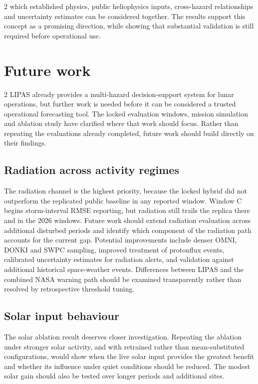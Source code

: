\begin{multicols}{2}
which established physics, public heliophysics inputs, cross-hazard relationships and uncertainty estimates can be considered together. The results support this concept as a promising direction, while showing that substantial validation is still required before operational use.
\end{multicols}
\section{Future work}
\begin{multicols}{2}
LIPAS already provides a multi-hazard decision-support system for lunar operations, but further work is needed before it can be considered a trusted operational forecasting tool. The locked evaluation windows, mission simulation and ablation study have clarified where that work should focus. Rather than repeating the evaluations already completed, future work should build directly on their findings.

\subsection{Radiation across activity regimes}

The radiation channel is the highest priority, because the locked hybrid did not outperform the replicated public baseline in any reported window. Window C begins storm-interval RMSE reporting, but radiation still trails the replica there and in the 2026 windows. Future work should extend radiation evaluation across additional disturbed periods and identify which component of the radiation path accounts for the current gap. Potential improvements include denser OMNI, DONKI and SWPC sampling, improved treatment of protonflux events, calibrated uncertainty estimates for radiation alerts, and validation against additional historical space-weather events. Differences between LIPAS and the combined NASA warning path should be examined transparently rather than resolved by retrospective threshold tuning.

\subsection{Solar input behaviour}

The solar ablation result deserves closer investigation. Repeating the ablation under stronger solar activity, and with retrained rather than mean-substituted configurations, would show when the live solar input provides the greatest benefit and whether its influence under quiet conditions should be reduced. The modest solar gain should also be tested over longer periods and additional sites.


\end{multicols}
